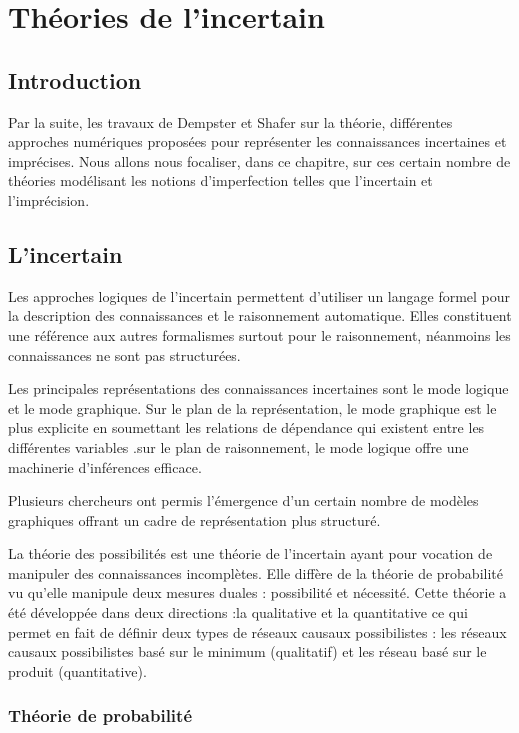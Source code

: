 \chapter{Théories de l'incertain}

{}
\section*{Introduction}
Par la suite, les travaux de Dempster et Shafer sur la théorie, différentes approches numériques
proposées pour représenter les connaissances incertaines et imprécises. Nous allons nous focaliser, dans ce chapitre, sur ces certain nombre de théories modélisant les notions d’imperfection telles que l’incertain et l’imprécision.

\section{L’incertain}

Les approches logiques de l’incertain permettent d’utiliser un langage formel pour la description des connaissances et le raisonnement automatique. Elles constituent une référence aux autres formalismes surtout pour le raisonnement, néanmoins les connaissances ne  sont pas structurées.

Les principales représentations des connaissances incertaines sont le mode logique et le mode graphique.\cite{hkhallafiThesis}
Sur le plan de la représentation, le mode graphique est le plus explicite en soumettant les relations de dépendance qui existent entre les différentes variables .sur le plan de raisonnement, le mode logique offre une machinerie d’inférences efficace.

Plusieurs chercheurs ont permis l’émergence d’un certain nombre de modèles graphiques offrant un cadre de représentation plus structuré.

La théorie des possibilités est une théorie de l’incertain ayant pour vocation de manipuler des connaissances incomplètes. Elle diffère de la théorie de probabilité  vu qu'elle manipule deux mesures duales : possibilité et nécessité. Cette théorie a été développée dans deux directions :la qualitative et la quantitative ce qui permet en fait de définir deux types de réseaux causaux possibilistes : les réseaux causaux possibilistes basé sur le minimum (qualitatif) et les réseau basé sur le produit (quantitative).\cite{hkhallafiThesis}\cite{kZebouchi2Thesis}
\subsection{Théorie de probabilité}

